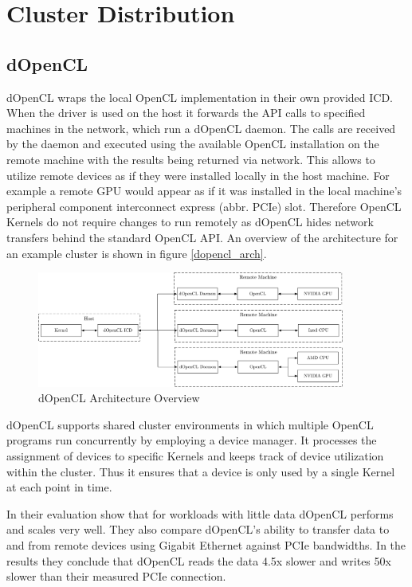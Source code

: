 \section{Cluster Distribution}

\subsection*{dOpenCL}

dOpenCL wraps the local OpenCL implementation in their own provided ICD. When the driver is used on the host it forwards the API calls to specified machines in the network, which run a dOpenCL daemon\cite{dopencl}. The calls are received by the daemon and executed using the available OpenCL installation on the remote machine with the results being returned via network. This allows to utilize remote devices as if they were installed locally in the host machine. For example a remote GPU would appear as if it was installed in the local machine's peripheral component interconnect express (abbr. PCIe) slot. Therefore OpenCL Kernels do not require changes to run remotely as dOpenCL hides network transfers behind the standard OpenCL API. An overview of the architecture for an example cluster is shown in figure \ref{dopencl_arch}.

\begin{figure}[H]
	
	\includegraphics[width=0.9\textwidth]{drawings/dopencl_arch.pdf}
	\centering
	\caption{dOpenCL Architecture Overview}
	\label{img:dopencl_arch}
\end{figure}

dOpenCL supports shared cluster environments in which multiple OpenCL programs run concurrently by employing a device manager. It processes the assignment of devices to specific Kernels and keeps track of device utilization within the cluster. Thus it ensures that a device is only used by a single Kernel at each point in time.

In their evaluation \citeauthor{dopencl} show that for workloads with little data dOpenCL performs and scales very well. They also compare dOpenCL's ability to transfer data to and from remote devices using Gigabit Ethernet against PCIe bandwidths. In the results they conclude that dOpenCL reads the data 4.5x slower and writes 50x slower than their measured PCIe connection.

